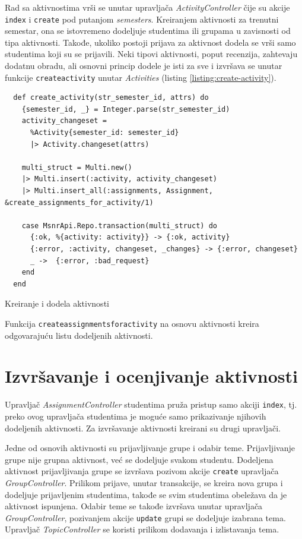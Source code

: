 \documentclass[12pt,oneside]{memoir}
\begin{document}
Rad sa aktivnostima vrši se unutar upravljača \emph{ActivityController} čije su akcije \texttt{index} i \texttt{create}
pod putanjom \emph{semesters}. Kreiranjem aktivnosti za trenutni semestar, ona se istovremeno dodeljuje studentima ili
grupama u zavisnosti od tipa aktivnosti. Takođe, ukoliko postoji prijava za aktivnost dodela se vrši samo studentima koji su
se prijavili. Neki tipovi aktivnosti, poput recenzija, zahtevaju dodatnu obradu, ali osnovni princip dodele je isti za sve i
izvršava se unutar funkcije \texttt{create{\textunderscore}activity}  unutar \emph{Activities} (listing \ref{listing:create-activity}). 
\begin{listing}[h!]
\begin{verbatim}
  def create_activity(str_semester_id, attrs) do
    {semester_id, _} = Integer.parse(str_semester_id)
    activity_changeset =
      %Activity{semester_id: semester_id}
      |> Activity.changeset(attrs)

    multi_struct = Multi.new()
    |> Multi.insert(:activity, activity_changeset)
    |> Multi.insert_all(:assignments, Assignment, &create_assignments_for_activity/1)

    case MsnrApi.Repo.transaction(multi_struct) do
      {:ok, %{activity: activity}} -> {:ok, activity}
      {:error, :activity, changeset, _changes} -> {:error, changeset}
      _ ->  {:error, :bad_request}
    end
  end
\end{verbatim}
\caption{Kreiranje i dodela aktivnosti}
\label{listing:create-activity}
\end{listing}

Funkcija \texttt{create{\textunderscore}assignments{\textunderscore}for{\textunderscore}activity} na osnovu aktivnosti
kreira odgovarajuću listu dodeljenih aktivnosti.
\section{Izvršavanje i ocenjivanje aktivnosti}

Upravljač \emph{AssignmentController} studentima pruža pristup samo akciji \texttt{index}, tj. preko ovog upravljača
studentima je moguće samo prikazivanje njihovih dodeljenih aktivnosti. Za izvršavanje aktivnosti kreirani su drugi upravljači.

Jedne od osnovih aktivnosti su prijavljivanje grupe i odabir teme. Prijavljivanje grupe nije grupna aktivnost, već se dodeljuje svakom
studentu. Dodeljena aktivnost prijavljivanja grupe se izvršava pozivom akcije \texttt{create} upravljača \emph{GroupController}.
Prilikom prijave, unutar transakcije, se kreira nova grupa i dodeljuje prijavljenim studentima, takođe se svim studentima
obeležava da je aktivnost ispunjena. Odabir teme se takođe izvršava unutar upravljača \emph{GroupController}, pozivanjem 
akcije \texttt{update} grupi se dodeljuje izabrana tema. Upravljač \emph{TopicController} se koristi prilikom dodavanja i izlistavanja tema.
\end{document}
